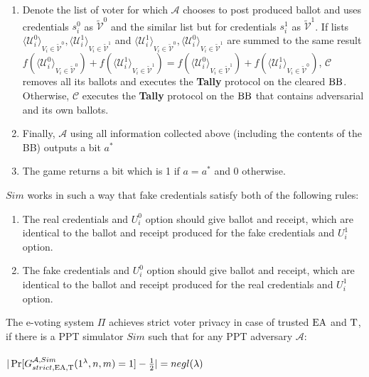 \begin{enumerate}
\begin{enumerate}
\end{enumerate}
\item Denote the list of voter for which $\mathcal{A}$ chooses to post produced ballot and uses credentials $s_i^0$  as $ \tilde{\mathcal{V}}^0$ and the similar list but for credentials $s_i^1$ as $ \tilde{\mathcal{V}}^1$.  If  lists $\langle \mathcal{U}^0_i \rangle _{V_i \in \tilde{\mathcal{V}}^0}, \langle \mathcal{U}^1_i \rangle _{V_i \in \tilde{\mathcal{V}}^1}$ and $\langle \mathcal{U}^1_i \rangle _{V_i \in \tilde{\mathcal{V}}^0}, \langle \mathcal{U}^0_i \rangle _{V_i \in \tilde{\mathcal{V}}^1}$ are summed to the same result $f(\langle \mathcal{U}^0_i \rangle _{V_i \in \tilde{\mathcal{V}}^0} ) + f(\langle \mathcal{U}^1_i \rangle _{V_i \in \tilde{\mathcal{V}}^1} ) =  f(\langle \mathcal{U}^0_i \rangle _{V_i \in \tilde{\mathcal{V}}^1} ) +  f(\langle \mathcal{U}^1_i \rangle _{V_i \in \tilde{\mathcal{V}}^0} )$, $\mathcal{C}$ removes all its ballots and executes the \textbf{Tally} protocol on the cleared $\operatorname{BB}$. Otherwise, $\mathcal{C}$ executes the \textbf{Tally} protocol on the $\operatorname{BB}$ that contains adversarial and its own ballots. 
\item Finally, $\mathcal{A}$ using all information collected above (including the contents of the BB) outputs a bit $a^*$
\item  The game returns a bit which is 1 if $a = a^*$ and 0 otherwise.
\end{enumerate}
\begin{remark}
$Sim$ works in such a way that fake credentials satisfy both of the following rules: 
\begin{enumerate}
 \item The real credentials and $U_i^0$ option  should give ballot and receipt, which are identical  to the ballot and receipt produced for the fake credentials and  $U_i^1$ option.
 \item The fake credentials and $U_i^0$ option  should give ballot and receipt, which are identical to the ballot and receipt produced for the real credentials and  $U_i^1$ option.
 \end{enumerate}
 \end{remark}
\begin{definition}
The e-voting system $\Pi$ achieves strict voter privacy in case of trusted $\operatorname{EA}$ and $\operatorname{T}$, if there is a PPT simulator $Sim$ such that for any PPT adversary $\mathcal{A}$:\\\\
 $|\Pr[G_{strict,\operatorname{EA},\operatorname{T}}^{\mathcal{A}, Sim}(1^{\lambda},n,m) = 1]- \frac{1}{2} |= negl(\lambda)$
 \end{definition}
 
